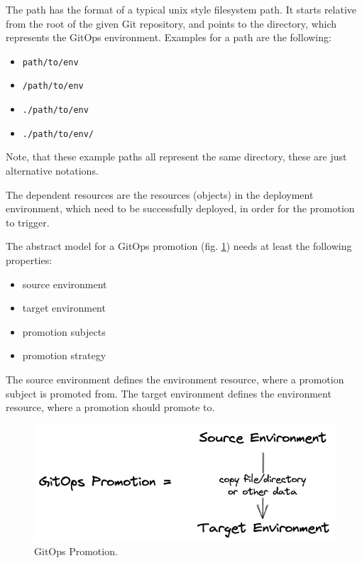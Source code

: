 The path has the format of a typical unix style filesystem path.
It starts relative from the root of the given Git repository,
and points to the directory, which represents the GitOps environment.
Examples for a path are the following:

\begin{itemize}
	\item \lstinline|path/to/env|
	\item \lstinline|/path/to/env|
	\item \lstinline|./path/to/env|
	\item \lstinline|./path/to/env/|
\end{itemize}

Note, that these example paths all represent the same directory,
these are just alternative notations.

The dependent resources are the resources (objects) in the deployment environment,
which need to be successfully deployed, in order for the promotion to trigger.

The abstract model for a GitOps promotion
(fig. \ref{fig:gitops-promo})
needs at least the following properties:

\begin{itemize}
	\item source environment
	\item target environment
	\item promotion subjects
	\item promotion strategy
\end{itemize}

The source environment defines the environment resource,
where a promotion subject is promoted from.
The target environment defines the environment resource,
where a promotion should promote to.

\begin{figure}[h]
	\centering
	\includegraphics[width=1.00\linewidth]{assets/gitops-promo.png}
	\caption{GitOps Promotion.
	}
	\label{fig:gitops-promo}	
\end{figure}

